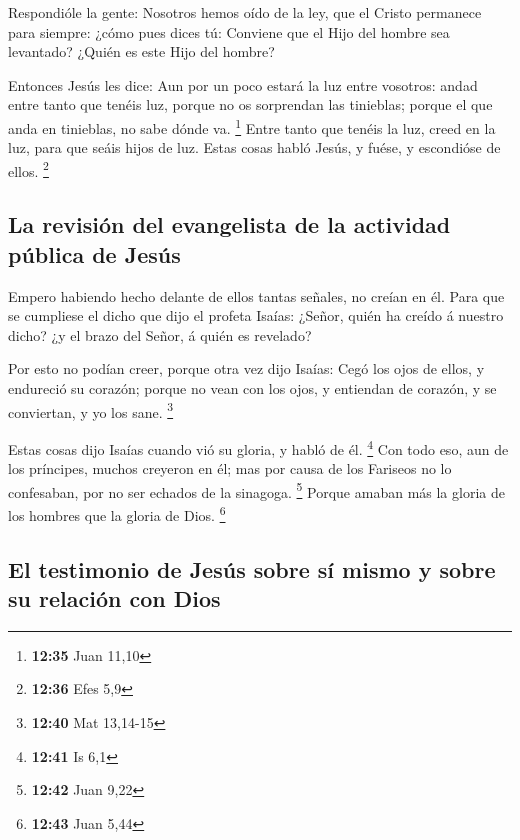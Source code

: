  Respondióle la gente: Nosotros hemos oído de la ley, que
el Cristo permanece para siempre: ¿cómo pues dices tú: Conviene que el
Hijo del hombre sea levantado? ¿Quién es este Hijo del hombre?

 Entonces Jesús les dice: Aun por un poco estará la luz
entre vosotros: andad entre tanto que tenéis luz, porque no os
sorprendan las tinieblas; porque el que anda en tinieblas, no sabe dónde
va. \footnote{\textbf{12:35} Juan 11,10}  Entre tanto que
tenéis la luz, creed en la luz, para que seáis hijos de luz. Estas cosas
habló Jesús, y fuése, y escondióse de ellos. \footnote{\textbf{12:36}
  Efes 5,9}

\hypertarget{la-revisiuxf3n-del-evangelista-de-la-actividad-puxfablica-de-jesuxfas}{%
\subsection{La revisión del evangelista de la actividad pública de
Jesús}\label{la-revisiuxf3n-del-evangelista-de-la-actividad-puxfablica-de-jesuxfas}}

 Empero habiendo hecho delante de ellos tantas señales,
no creían en él.  Para que se cumpliese el dicho que dijo
el profeta Isaías: ¿Señor, quién ha creído á nuestro dicho? ¿y el brazo
del Señor, á quién es revelado?

 Por esto no podían creer, porque otra vez dijo Isaías:
 Cegó los ojos de ellos, y endureció su corazón; porque
no vean con los ojos, y entiendan de corazón, y se conviertan, y yo los
sane. \footnote{\textbf{12:40} Mat 13,14-15}

 Estas cosas dijo Isaías cuando vió su gloria, y habló de
él. \footnote{\textbf{12:41} Is 6,1}  Con todo eso, aun
de los príncipes, muchos creyeron en él; mas por causa de los Fariseos
no lo confesaban, por no ser echados de la sinagoga. \footnote{\textbf{12:42}
  Juan 9,22}  Porque amaban más la gloria de los hombres
que la gloria de Dios. \footnote{\textbf{12:43} Juan 5,44}

\hypertarget{el-testimonio-de-jesuxfas-sobre-suxed-mismo-y-sobre-su-relaciuxf3n-con-dios}{%
\subsection{El testimonio de Jesús sobre sí mismo y sobre su relación
con
Dios}\label{el-testimonio-de-jesuxfas-sobre-suxed-mismo-y-sobre-su-relaciuxf3n-con-dios}}

